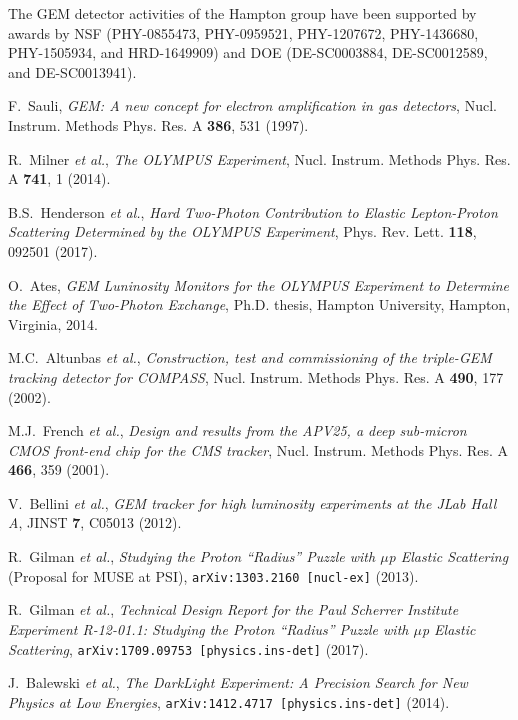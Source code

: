 \documentclass{PoS}
\begin{document}
The GEM detector activities of the Hampton group have been supported by awards
by NSF (PHY-0855473, PHY-0959521, PHY-1207672, PHY-1436680, PHY-1505934,
and HRD-1649909) and DOE (DE-SC0003884, DE-SC0012589, and DE-SC0013941).

\begin{thebibliography}{99}

  F.~Sauli, \emph{GEM: A new concept for electron amplification in gas
    detectors},
  Nucl. Instrum. Methods Phys. Res. A {\bf 386}, 531 (1997).

  R.~Milner {\it et al.}, \emph{The OLYMPUS Experiment},
  Nucl. Instrum. Methods Phys. Res. A {\bf 741}, 1 (2014).

  B.S.~Henderson {\it et al.}, \emph{Hard Two-Photon Contribution to Elastic
    Lepton-Proton Scattering Determined by the OLYMPUS Experiment},
  Phys. Rev. Lett. {\bf 118}, 092501 (2017).

  O.~Ates, \emph{GEM Luninosity Monitors for the OLYMPUS Experiment to
    Determine the Effect of Two-Photon Exchange}, Ph.D. thesis,
  Hampton University, Hampton, Virginia, 2014.

  M.C.~Altunbas {\it et al.}, \emph{Construction, test and commissioning of
    the triple-GEM tracking detector for COMPASS},
  Nucl. Instrum. Methods Phys. Res. A {\bf 490}, 177 (2002).

  M.J.~French {\it et al.}, \emph{Design and results from the APV25, a deep
    sub-micron CMOS front-end chip for the CMS tracker},
  Nucl. Instrum. Methods Phys. Res. A {\bf 466}, 359 (2001).

  V.~Bellini {\it et al.}, \emph{GEM tracker for high luminosity experiments
    at the JLab Hall A},
  JINST {\bf 7}, C05013 (2012).

   R.~Gilman {\it et al.}, \emph{Studying the Proton ``Radius'' Puzzle with
     $\mu$p Elastic Scattering} (Proposal for MUSE at PSI),
   {\tt arXiv:1303.2160 [nucl-ex]} (2013).
 
   R.~Gilman {\it et al.}, \emph{Technical Design Report for the Paul Scherrer
     Institute Experiment R-12-01.1: Studying the Proton ``Radius'' Puzzle with
     $\mu$p Elastic Scattering}, 
   {\tt arXiv:1709.09753 [physics.ins-det]} (2017).

   J.~Balewski {\it et al.}, \emph{The DarkLight Experiment: A Precision
     Search for New Physics at Low Energies},
   {\tt arXiv:1412.4717 [physics.ins-det]} (2014).

\end{thebibliography}
\end{document}
